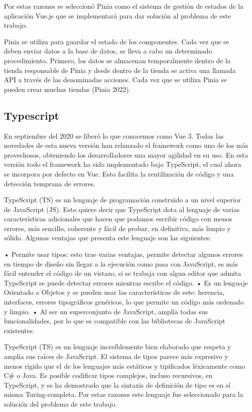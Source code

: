 Por estas razones se seleccionó Pinia como el sistema de gestión de estados de la aplicación Vue.js que se implementará para dar solución al problema de este trabajo.

Pinia se utiliza para guardar el estado de los componentes. Cada vez que se deben enviar datos a la base de datos, se lleva a cabo un determinado procedimiento. Primero, los datos se almacenan temporalmente dentro de la tienda responsable de Pinia y desde dentro de la tienda se activa una llamada API a través de las denominadas acciones. Cada vez que se utiliza Pinia se pueden crear muchas tiendas (Pinia 2022).

\subsection{Typescript}

En septiembre del 2020 se liberó lo que conocemos como Vue 3. Todas las novedades de esta nueva versión han relanzado el framework como uno de los más provechosos, obteniendo los desarrolladores una mayor agilidad en su uso. En esta versión todo el framework ha sido implementado bajo TypeScript, el cual ahora se incorpora por defecto en Vue. Esto facilita la reutilización de código y una detección temprana de errores.

TypeScript (TS) es un lenguaje de programación construido a un nivel superior de JavaScript (JS). Esto quiere decir que TypeScript dota al lenguaje de varias características adicionales que hacen que podamos escribir código con menos errores, más sencillo, coherente y fácil de probar, en definitiva, más limpio y sólido. Algunas ventajas que presenta este lenguaje son las siguientes:

• Permite usar tipos: esto trae varias ventajas, permite detectar algunos errores en tiempo de diseño sin llegar a la ejecución como pasa con JavaScript, es más fácil entender el código de un vistazo, si se trabaja con algun editor que admita TypeScript se puede detectar errores mientras escribe el código.
• Es un lenguaje Orientado a Objetos y se pueden usar las características de este: herencia, interfaces, errores tipográficos genéricos, lo que permite un código más ordenado y limpio.
• Al ser un superconjunto de JavaScript, amplía todas sus funcionalidades, por lo que es compatible con las bibliotecas de JavaScript existentes.

TypeScript (TS) es un lenguaje increíblemente bien elaborado que respeta y amplía sus raíces de JavaScript. El sistema de tipos parece más expresivo y menos rígido que el de los lenguajes más estáticos y tipificados léxicamente como C$\#$ o Java. Es posible codificar tipos complejos, incluso recursivos, en TypeScript, y se ha demostrado que la sintaxis de definición de tipo es en sí misma Turing-completa. Por estas razones este lenguaje fue seleccionado para la solución del problema de este trabajo.


